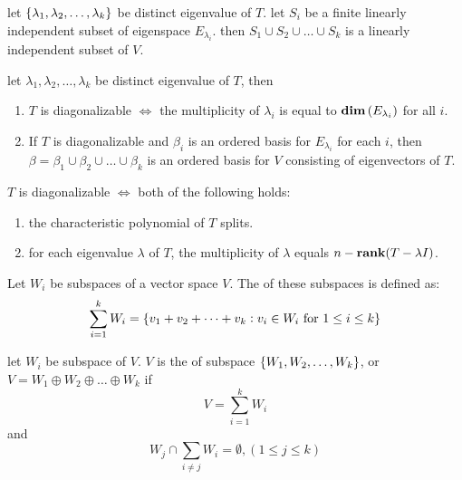 \begin{theorem}
    let $\set{\lambda_1, \lambda_2, \dots, \lambda_k}$ be distinct eigenvalue of $T$. let $S_i$ be a finite linearly independent subset of eigenspace $E_{\lambda_i}$. then $S_1 \cup S_2 \cup \dots \cup S_k$ is a linearly independent subset of $V$.
\end{theorem}

\begin{theorem}
    let $\lambda_1, \lambda_2, \dots, \lambda_k$ be distinct eigenvalue of $T$, then
    \begin{enumerate}
        \item $T$ is diagonalizable $\iff$ the multiplicity of $\lambda_i$ is equal to $\displaystyle \mathbf{dim}\left( E_{\lambda_i} \right)$ for all $i$.
        \item If $T$ is diagonalizable and $\beta_i$ is an ordered basis for $E_{\lambda_i}$ for each $i$, then $\beta = \beta_1 \cup \beta_2 \cup \dots \cup \beta_k$ is an ordered basis for $V$ consisting of eigenvectors of $T$.
    \end{enumerate}
\end{theorem}

\begin{theorem}
    $T$ is diagonalizable $\iff$ both of the following holds:
    \begin{enumerate}
        \item the characteristic polynomial of $T$ splits.
        \item for each eigenvalue $\lambda$ of $T$, the multiplicity of $\lambda$ equals $n - \displaystyle \mathbf{rank}( T - \lambda I )$.
    \end{enumerate}
\end{theorem}

\begin{definition}
    Let $W_i$ be subspaces of a vector space $V$. The  of these subspaces is defined as:
    \begin{equation}
        \sum_{i=1}^k W_i = \set{v_1 + v_2 + \dots + v_k : v_i \in W_i \text{ for } 1 \leq i \leq k }
    \end{equation}
\end{definition}

\begin{definition}
    let $W_i$ be subspace of $V$. $V$ is the  of subspace $\set{W_1, W_2, \dots, W_k}$, or $V = W_1 \oplus W_2 \oplus \dots \oplus W_k$ if
    \begin{equation*}
        V = \sum_{i=1}^k W_i
    \end{equation*}
    and 
    \begin{equation*}
        W_j \cap \sum_{i \neq j} W_i = \emptyset, (1 \leq j \leq k)
    \end{equation*}
\end{definition}


